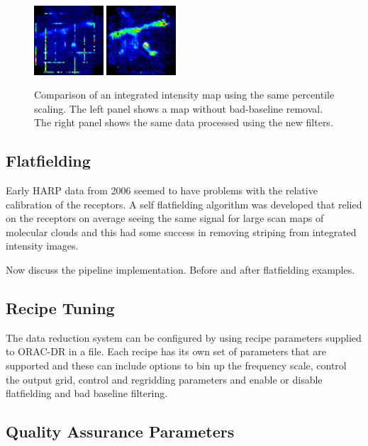 \documentclass[final,authoryear,5p,times,twocolumn]{elsarticle}
\begin{document}
\begin{figure}
\includegraphics[width=0.23\textwidth]{P61_f3a}
\includegraphics[width=0.23\textwidth]{P61_f3b}
\caption{Comparison of an integrated intensity map using the same
  percentile scaling.  The left panel shows a map without bad-baseline
  removal.  The right panel shows the same data processed using the
  new filters.}
\label{fig:badbase:results}
\end{figure}

\subsection{Flatfielding}

Early HARP data from 2006 seemed to have problems with the relative
calibration of the receptors. A self flatfielding algorithm was
developed that relied on the receptors on average seeing the same
signal for large scan maps of molecular clouds
\citep{2010MNRAS.401..455C} and this had some success in removing
striping from integrated intensity images.

Now discuss the pipeline implementation. Before and after flatfielding examples.

\subsection{Recipe Tuning}

The data reduction system can be configured by using recipe parameters
supplied to ORAC-DR in a file. Each recipe has its own set of
parameters that are supported and these can include options to bin up
the frequency scale, control the output grid, control and regridding
parameters and enable or disable flatfielding and bad baseline filtering.

\subsection{Quality Assurance Parameters}
\end{document}
